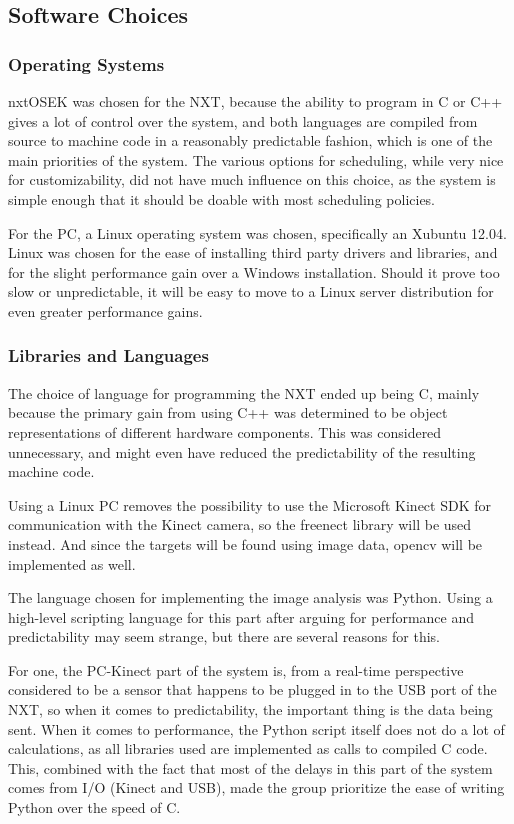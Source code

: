 \subsection{Software Choices}

\subsubsection*{Operating Systems}
nxtOSEK was chosen for the NXT, because the ability to program in C or C++ gives a lot of control over the
system, and both languages are compiled from source to machine code in a reasonably predictable fashion, which
is one of the main priorities of the system. The various options for scheduling,
while very nice for customizability, did not have much influence on this choice, as the system is simple enough
that it should be doable with most scheduling policies.

For the PC, a Linux operating system was chosen, specifically an Xubuntu 12.04. Linux was chosen for the ease
of installing third party drivers and libraries, and for the slight performance gain over a Windows installation.
Should it prove too slow or unpredictable, it will be easy to move to a Linux server distribution for even
greater performance gains. 

\subsubsection*{Libraries and Languages}
The choice of language for programming the NXT ended up being C, mainly because the primary gain from using C++ was
determined to be object representations of different hardware components. This was considered unnecessary,
and might even have reduced the predictability of the resulting machine code.

Using a Linux PC removes the possibility to use the Microsoft Kinect SDK for communication with the
Kinect camera, so the freenect library will be used instead. And since the targets will be found using image
data, \ac{opencv} will be implemented as well.

The language chosen for implementing the image analysis was Python. Using a high-level scripting language for
this part after arguing for performance and predictability may seem strange, but there are several reasons for
this.

For one, the PC-Kinect part of the system is, from a real-time perspective considered to be a sensor that
happens to be plugged in to the USB port of the NXT, so when it comes to predictability, the important thing is
the data being sent.
When it comes to performance, the Python script itself does not do a lot of calculations, as all libraries used
are implemented as calls to compiled C code. This, combined with the fact that most of the delays in this part
of the system comes from I/O (Kinect and USB), made the group prioritize the ease of writing Python over the
speed of C.

